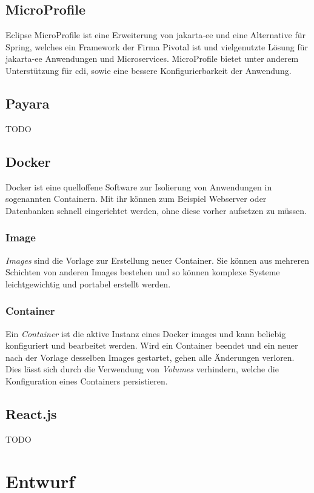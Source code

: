 \documentclass[12pt,twoside,a4paper]{article}
\begin{document}
\subsection{MicroProfile}\label{sec:microprofile}
Eclipse MicroProfile ist eine Erweiterung von \acrshort{jakarta-ee} und eine Alternative für Spring, welches ein Framework der Firma Pivotal ist und vielgenutzte Lösung für \acrshort{jakarta-ee} Anwendungen und Microservices.\newline
MicroProfile bietet unter anderem Unterstützung für \acrfull{cdi}, sowie eine bessere Konfigurierbarkeit der Anwendung.\newline\cite{microprofile}
\subsection{Payara}
TODO
\subsection{Docker}
Docker ist eine quelloffene Software zur Isolierung von Anwendungen in sogenannten Containern. Mit ihr können zum Beispiel Webserver oder Datenbanken schnell eingerichtet werden, ohne diese vorher aufsetzen zu müssen.
\subsubsection{Image}
\textit{Images} sind die Vorlage zur Erstellung neuer Container. Sie können aus mehreren Schichten von anderen Images bestehen und so können komplexe Systeme leichtgewichtig und portabel erstellt werden.
\subsubsection{Container}
Ein \textit{Container} ist die aktive Instanz eines Docker images und kann beliebig konfiguriert und bearbeitet werden. Wird ein Container beendet und ein neuer nach der Vorlage desselben Images gestartet, gehen alle Änderungen verloren. Dies lässt sich durch die Verwendung von \textit{Volumes} verhindern, welche die Konfiguration eines Containers persistieren.
\subsection{React.js}
TODO
\newpage
\section{Entwurf}
\end{document}

